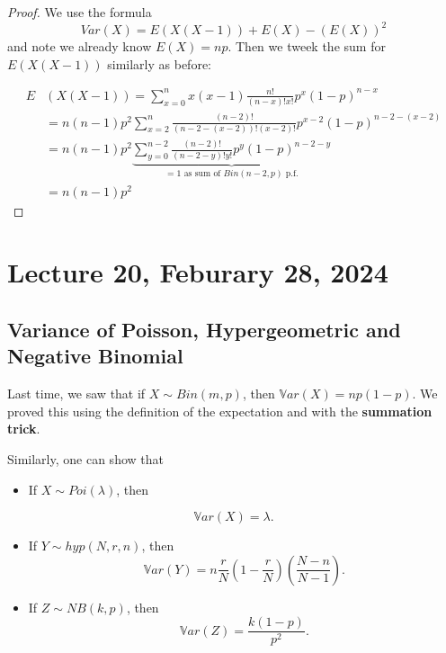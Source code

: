 \documentclass[
]{book}
\providecommand{\tightlist}{%
  \setlength{\itemsep}{0pt}\setlength{\parskip}{0pt}}
\theoremstyle{definition}
\theoremstyle{definition}
\theoremstyle{definition}
\theoremstyle{definition}
\theoremstyle{remark}
\begin{document}
\begin{proof}
We use the formula \[Var(X) = E(X(X-1)) + E(X) - (E(X))^2\] and note we already know \(E(X)=np\).\pause
Then we tweek the sum for \(E(X(X-1))\) similarly as before:

\begin{align*}
E&(X(X-1)) =\sum_{x=0}^n x(x-1) \frac{n!}{(n-x)! x!} p^x (1-p)^{n-x} \\
&= n(n-1) p^2 \sum_{x=2}^n \frac{(n-2)!}{(n-2-(x-2))!(x-2)!} p^{x-2} (1-p)^{n-2-(x-2)}\\
&= n(n-1) p^2 \underbrace{\sum_{y=0}^{n-2} \frac{(n-2)!}{(n-2-y)!y!} p^{y} (1-p)^{n-2-y}}_{=1\text{ as sum of $Bin(n-2,p)$ p.f.}}\\
&= n(n-1) p^2
\end{align*}
\end{proof}

\chapter{Lecture 20, Feburary 28, 2024}\label{lecture-20-feburary-28-2024}

\newcommand{\var}{\mathbb{V}ar}
\newcommand{\R}{\mathbb{R}}

\section{Variance of Poisson, Hypergeometric and Negative Binomial}\label{variance-of-poisson-hypergeometric-and-negative-binomial}

Last time, we saw that if \(X \sim Bin(m,p)\), then \(\mathbb{V}ar(X) = np(1-p)\). We proved this using the definition of the expectation and with the \textbf{summation trick}.

Similarly, one can show that

\begin{itemize}
\tightlist
\item
  If \(X\sim Poi(\lambda)\), then
\end{itemize}

\[
\mathbb{V}ar(X) = \lambda.
\]

\begin{itemize}
\item
  If \(Y \sim hyp(N,r,n)\), then
  \[
  \mathbb{V}ar(Y) = n \frac{r}{N} \left(1-\frac{r}{N}\right)\left(\frac{N-n}{N-1}\right).
  \]
\item
  If \(Z \sim NB(k,p)\), then
  \[
  \mathbb{V}ar(Z) = \frac{k(1-p)}{p^2}.
  \]
\end{itemize}
\end{document}
